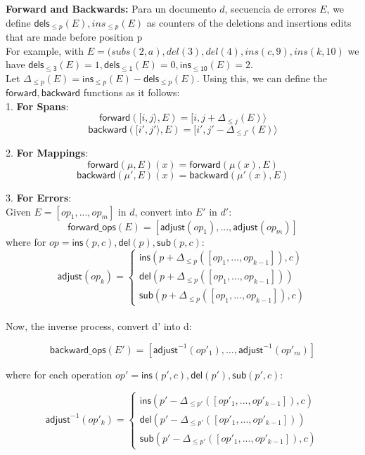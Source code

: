 \documentclass{article}
\begin{document}
\textbf{Forward and Backwards:} Para un documento $d$, secuencia de errores $E$, we define $\mathsf{dels}_{\leq p}(E), ins_{\leq p}(E)$ as counters of the deletions and insertions edits that are made before position p \\

For example, with $ E = (subs(2, a), del(3), del(4), ins(c, 9) , ins (k ,10)$ we have $\mathsf{dels_{\leq 3}} (E) = 1, \mathsf{dels_{\leq 1}} (E)  = 0, \mathsf{ins_{\leq 10}} (E) = 2$. \\

Let $\Delta_{\leq p} (E) = \mathsf{ins}_{\leq p}(E) - \mathsf{dels}_{\leq p} (E)$. Using this, we can define the $\mathsf{forward}, \mathsf{backward}$ functions as it follows: \\

1. \textbf{For Spans}:
\[
\mathsf{forward}([i,j\rangle, E) = [i, j + \Delta_{\leq j}(E)\rangle
\]
\[
\mathsf{backward}([i',j'\rangle, E) = [i', j' - \Delta_{\leq j'}(E)\rangle
\]

2. \textbf{For Mappings}:
\[
\mathsf{forward}(\mu, E)(x) = \mathsf{forward}(\mu(x), E)
\]
\[
\mathsf{backward}(\mu', E)(x) = \mathsf{backward}(\mu'(x), E)
\]

3. \textbf{For Errors}:\\
Given $E = [op_1,...,op_m]$ in $d$, convert into $E'$ in $d'$:
\[
\mathsf{forward\_ops}(E) = [\mathsf{adjust}(op_1),...,\mathsf{adjust}(op_m)]
\]
where for $op = \mathsf{ins}(p,c), \mathsf{del}(p), \mathsf{sub}(p,c)$:
\[
\mathsf{adjust}(op_k) = 
\begin{cases}
\mathsf{ins}(p + \Delta_{\leq p}([op_1, ..., op_{k-1}]), c) \\
\mathsf{del}(p + \Delta_{\leq p}([op_1, ..., op_{k-1}])) \\
\mathsf{sub}(p + \Delta_{\leq p}([op_1, ..., op_{k-1}]), c)
\end{cases}
\]\\

Now, the inverse process, convert d' into d:

\[
\mathsf{backward\_ops}(E') = [\mathsf{adjust}^{-1}(op'_1), \dots, \mathsf{adjust}^{-1}(op'_m)]
\]

where for each operation $op' =  \mathsf{ins}(p', c), \mathsf{del}(p'), \mathsf{sub}(p', c)$:

\[
\mathsf{adjust}^{-1}(op'_k) = 
\begin{cases}
\mathsf{ins}(p' - \Delta_{\leq p'}([op'_1, ..., op'_{k-1}]), c) \\
\mathsf{del}(p' - \Delta_{\leq p'}([op'_1, ..., op'_{k-1}])) \\
\mathsf{sub}(p' - \Delta_{\leq p'}([op'_1, ..., op'_{k-1}]), c)
\end{cases}
\]\\
\end{document}
